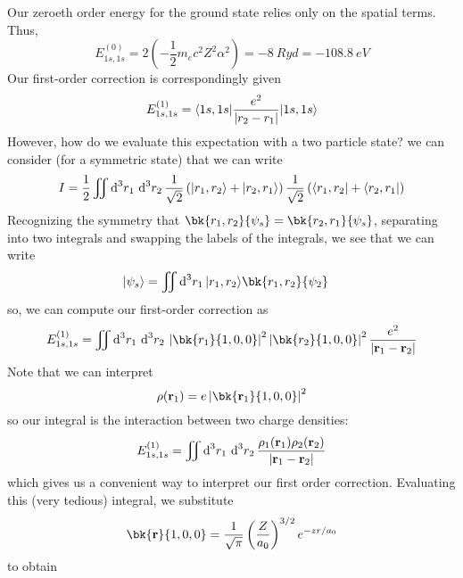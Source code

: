 Our zeroeth order energy for the ground state relies only on the spatial terms. Thus, 
\[E^{(0)}_{1s,1s} = 2\left(-\frac{1}{2}m_ec^2Z^2\alpha^2\right) = \SI{-8}{Ryd} = \SI{-108.8}{eV}\]
Our first-order correction is correspondingly given
\[E_{1s,1s}^{(1)} = \langle1s,1s\rvert\frac{e^2}{\left|r_2-r_1\right|}\lvert1s,1s\rangle\]
However, how do we evaluate this expectation with a two particle state? we can consider (for a symmetric state) that we can write
\begin{equation}
	I = \frac{1}{2}\iint\d[3]{r_1}\d[3]{r_2}\frac{1}{\sqrt{2}}\left(\k{r_1,r_2}+\k{r_2,r_1}\right)\frac{1}{\sqrt{2}}\left(\b{r_1,r_2}+\b{r_2,r_1}\right)
\end{equation}
Recognizing the symmetry that \(\bk{r_1,r_2}{\p_s} =\bk{r_2,r_1}{\p_s}\), separating into two integrals and swapping the labels of the integrals, we see that we can write
\begin{align*}
	\k{\p_s} &=\iint\d[3]{r_1}\k{r_1,r_2}\bk{r_1,r_2}{\p_2}
\end{align*}
so, we can compute our first-order correction as
\[E^{(1)}_{1s,1s} = \iint\d[3]{r_1}\d[3]{r_2} \abs{\bk{r_1}{1,0,0}}^2\abs{\bk{r_2}{1,0,0}}^2\frac{e^2}{\abs{\vb r_1-\vb r_2}}\]
Note that we can interpret
\begin{equation}
	\rho(\vb r_1) = e\abs{\bk{\vb r_1}{1,0,0}}^2
\end{equation}
so our integral is the interaction between two charge densities:
\[E^{(1)}_{1s,1s} = \iint\d[3]{r_1}\d[3]{r_2} \frac{\rho_1(\vb r_1)\rho_2(\vb r_2)}{\abs{\vb r_1-\vb r_2}}\]
which gives us a convenient way to interpret our first order correction. Evaluating this (very tedious) integral, we substitute
\[\bk{\vb r}{1,0,0} = \frac{1}{\sqrt\pi}\left(\frac{Z}{a_0}\right)^{3/2}e^{-zr/a_0}\]
to obtain 
